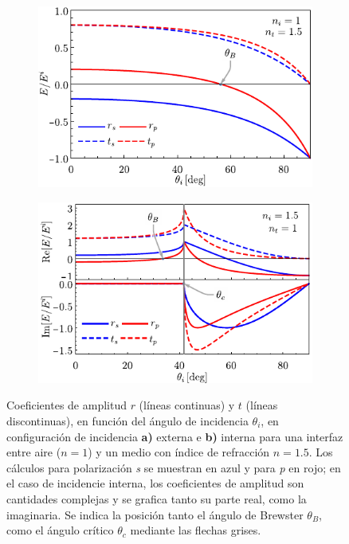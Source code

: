 \begin{figure}[h!]\centering\hspace*{-1.5em}
	\begin{subfigure}{.05\textwidth}\vspace{-4.5cm}\caption{}\label{sfig:coefExt}\end{subfigure}
	\begin{subfigure}{.43\textwidth} \hspace*{-.8cm}
	\includegraphics[scale=1]{1-Teoria/figs/1-1-ampCoefExt}
	\end{subfigure}
	\begin{subfigure}{.05\textwidth}\vspace{-4.5cm}\caption{}\label{sfig:coefInt}\end{subfigure}
	\begin{subfigure}{.43\textwidth} \hspace*{-.9cm}
	\includegraphics[scale=1]{1-Teoria/figs/1-1-ampCoefInt}
	\end{subfigure}\vspace*{-.7em}
	\caption{ Coeficientes de amplitud $r$ (líneas continuas) y $t$ (líneas discontinuas), en función del ángulo de incidencia $\theta_i$, en configuración de incidencia \textbf{a)} externa e \textbf{b)} interna para una interfaz entre  aire ($n=1$) y un medio con índice de refracción $n = 1.5$. Los cálculos para polarización  \emph{s} se muestran  en azul y  para \emph{p} en rojo; en el caso de incidencie interna, los coeficientes de amplitud son cantidades complejas y se grafica tanto su parte real, como la imaginaria. Se indica la posición tanto el ángulo de Brewster $\theta_B$, como el ángulo crítico $\theta_c$ mediante las flechas grises.}	\label{fig:coefAmp}	
	\end{figure}	


